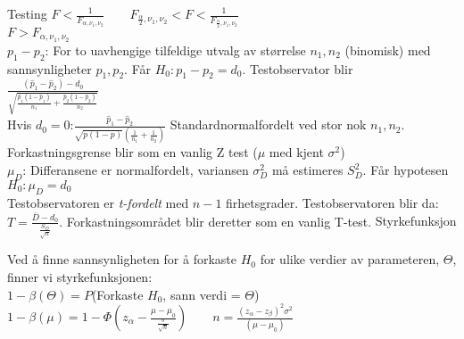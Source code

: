 \documentclass[final,hyperref={pdfpagelabels=false}]{beamer}
\begin{document}
\begin{frame}{}
\begin{columns}[t]
\begin{column}{.25\linewidth}
\begin{block}{\center\normalsize Testing}
{					$F<\frac{1}{F_{\alpha,\nu_1,\nu_2}} \qquad F_{\frac{\alpha}{2},\nu_1,\nu_2} < F < \frac{1}{F_{\frac{\alpha}{2},\nu_1,\nu_2}} $\\$ F > F_{\alpha,\nu_1,\nu_2}$\\
					$p_1-p_2$: For to uavhengige tilfeldige utvalg av størrelse $n_1,n_2$ (binomisk) med sannsynligheter $p_1,p_2$. Får $H_0:p_1-p_2=d_0$. Testobservator blir\\
					$\frac{(\hat p_1 - \hat p_2)-d_0}{\sqrt{\frac{\hat p_1(1-\hat p_1)}{n_1}+\frac{\hat p_2 (1-\hat p_2)}{n_2}}}$ \\Hvis $d_0=0$:$\frac{\hat p_1 - \hat p_2}{\sqrt{p(1-p)}\left(\frac{1}{n_1}+\frac{1}{n_2}\right)}$ Standardnormalfordelt ved stor nok $n_1,n_2$. Forkastningsgrense blir som en vanlig Z test ($\mu$ med kjent $\sigma^2$)\\
					$\mu_D$: Differansene er normalfordelt, variansen $\sigma_D^2$ må estimeres $S_D^2$. Får hypotesen $H_0:\mu_D=d_0$\\
					Testobservatoren er \textit{t-fordelt} med $n-1$ firhetsgrader. Testobservatoren blir da: $T=\frac{\bar D - d_0}{\frac{S_D}{\sqrt n}}$. Forkastningsområdet blir deretter som en vanlig T-test.
				}
				\center\normalsize Styrkefunksjon\\
				{\footnotesize\raggedright
					Ved å finne sannsynligheten for å forkaste $H_0$ for ulike verdier av parameteren, $\Theta$, finner vi styrkefunksjonen:\\
					$1-\beta(\Theta)=P$(Forkaste $H_0$, sann verdi = $\Theta$)
					$1-\beta(\mu)=1-\Phi\left(z_\alpha-\frac{\mu-\mu_0}{\frac{\sigma}{\sqrt n}}\right) \qquad n=\frac{(z_\alpha-z_\beta)^2\sigma^2}{(\mu-\mu_0)}$
				}
			\end{block}
		\end{column}
	\end{columns}
\end{frame}
\end{document}
